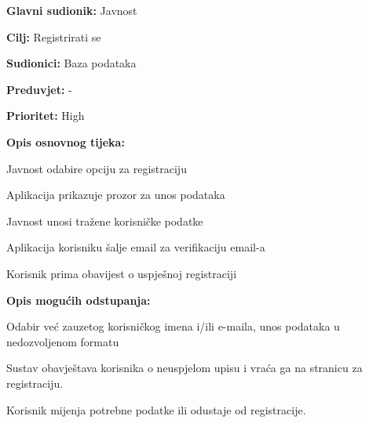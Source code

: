 	
	\noindent {}
	\begin{packed_item}
	
		\item \textbf{Glavni sudionik: }Javnost
		\item  \textbf{Cilj:} Registrirati se
		\item  \textbf{Sudionici:} Baza podataka
		\item  \textbf{Preduvjet:} -
		\item  \textbf{Prioritet:} High
		\item  \textbf{Opis osnovnog tijeka:}
		
		\item[] \begin{packed_enum}

			\item Javnost odabire opciju za registraciju
			\item Aplikacija prikazuje prozor za unos podataka
			\item Javnost unosi tražene korisničke podatke
			\item Aplikacija korisniku šalje email za verifikaciju email-a
			\item Korisnik prima obavijest o uspješnoj registraciji
		\end{packed_enum}
		
		\item  \textbf{Opis mogućih odstupanja:}
		
		\item[] \begin{packed_item}

			\item[2.a] Odabir već zauzetog korisničkog imena i/ili e-maila, unos podataka u nedozvoljenom formatu
			\item[] \begin{packed_enum}

				\item Sustav obavještava korisnika o neuspjelom upisu i vraća ga na stranicu za registraciju.
				\item Korisnik mijenja potrebne podatke ili odustaje od registracije.

			\end{packed_enum}
		\end{packed_item}						
	\end{packed_item}

